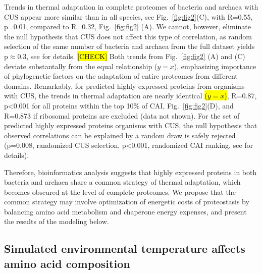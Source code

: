 \documentclass[10pt,letterpaper]{article}
\begin{document}
Trends in thermal adaptation in complete proteomes of bacteria and archaea with CUS appear more similar than in all species, see Fig.~\ref{fig:fig2}(C), with R=0.55, p=0.01, compared to R=0.32, Fig.~\ref{fig:fig2} (A). We cannot, however, eliminate the null hypothesis that CUS does not affect this type of correlation, as random selection of the same number of bacteria and archaea from the full dataset yields p$\approx$0.3, see  for details. \hl{[CHECK]} Both trends from Fig.~\ref{fig:fig2} (A) and (C) deviate substantally from the equal relationship ($y=x$), emphasizing importance of phylogenetic factors on the adaptation of entire proteomes from different domains. Remarkably, for predicted highly expressed proteins from organisms with CUS, the trends in thermal adaptation are nearly identical \hl{($y=x$)}, R=0.87, p\textless 0.001 for all proteins within the top 10\% of CAI, Fig.~\ref{fig:fig2}(D), and R=0.873 if ribosomal proteins are excluded (data not shown). For the set of predicted highly expressed proteins organisms with CUS, the null hypothesis that observed correlations can be explained by a random draw is safely rejected (p=0.008, randomized CUS selection,  p\textless0.001, randomized CAI ranking, see  for details).

Therefore, bioinformatics analysis suggests that highly expressed proteins in both bacteria and archaea share a common strategy of thermal adaptation, which becomes obscured at the level of complete proteomes. We propose that the common strategy may involve optimization of energetic costs of proteostasis by balancing amino acid metabolism and chaperone energy expenses, and present the results of the modeling below. 

\subsection*{Simulated environmental temperature affects amino acid composition}
\end{document}
